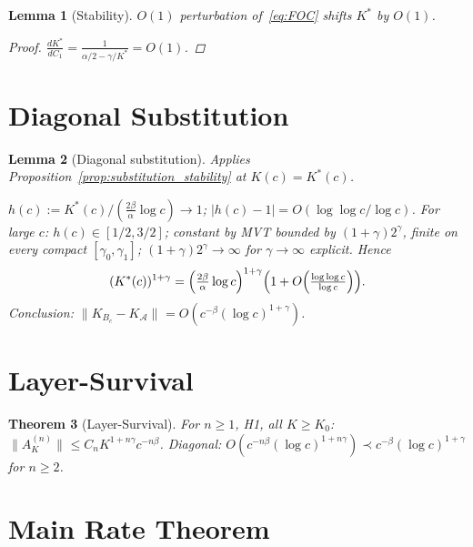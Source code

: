 \documentclass[12pt,a4paper]{amsart}
\newtheorem{theorem}{Theorem}[section]
\newtheorem{lemma}[theorem]{Lemma}
\theoremstyle{definition}
\newcommand{\cA}{\mathcal{A}}
\newcommand{\cK}{K_{B_c}}
\newcommand{\cKA}{K_{\cA}}
\newcommand{\normh}[2]{\|#1\|_{#2}}
\begin{document}
\begin{lemma}[Stability]
\label{lem:stability_kopt}
$O(1)$ perturbation of~\eqref{eq:FOC} shifts $K^*$ by $O(1)$.
\begin{proof}
$\frac{dK^*}{dC_1}=\frac{1}{\alpha/2-\gamma/K^*}=O(1)$.
\end{proof}
\end{lemma}

\section{Diagonal Substitution}
\label{sec:diagonal}

\begin{lemma}[Diagonal substitution]
\label{lem:diagonal_sub}
Applies Proposition~\ref{prop:substitution_stability} at $K(c)=K^*(c)$.

$h(c):=K^*(c)/(\tfrac{2\beta}{\alpha}\log c)\to 1$;
$|h(c)-1|=O(\log\log c/\log c)$.
For large $c$: $h(c)\in[1/2,3/2]$;
constant by MVT bounded by $(1+\gamma)2^\gamma$,
finite on every compact $[\gamma_0,\gamma_1]$;
$(1+\gamma)2^\gamma\to\infty$ for $\gamma\to\infty$ explicit.
Hence
\begin{equation}\label{eq:Kstar_power}
  (K^*(c))^{1+\gamma}
  =\Bigl(\tfrac{2\beta}{\alpha}\log c\Bigr)^{1+\gamma}
  \Bigl(1+O\Bigl(\tfrac{\log\log c}{\log c}\Bigr)\Bigr).
\end{equation}
Conclusion: $\normh{\cK-\cKA}{}=O(c^{-\beta}(\log c)^{1+\gamma})$.
\end{lemma}

\section{Layer-Survival}
\label{sec:layersurvival}

\begin{theorem}[Layer-Survival]
\label{thm:layer_survival}
For $n\geq 1$, H1, all $K\geq K_0$:
$\normh{A_K^{(n)}}{}\leq C_n K^{1+n\gamma}c^{-n\beta}$.
Diagonal: $O(c^{-n\beta}(\log c)^{1+n\gamma})\prec c^{-\beta}(\log c)^{1+\gamma}$
for $n\geq 2$.
\end{theorem}

\section{Main Rate Theorem}
\label{sec:main}
\end{document}
